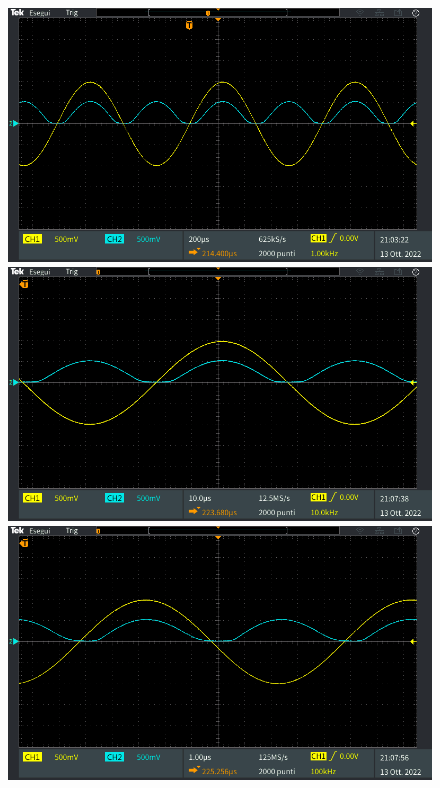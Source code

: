 \begin{figure}[tbh]
	\centering
	\begin{minipage}{.496\textwidth}
		\includegraphics[width=\linewidth]{./ImageFiles/Laboratorio 2/TEK00041.PNG}
	\end{minipage}
	\begin{minipage}{.496\textwidth}
		\includegraphics[width=\linewidth]{./ImageFiles/Laboratorio 2/TEK00046.PNG}
	\end{minipage}
	\begin{minipage}{.496\textwidth}
		\includegraphics[width=\linewidth]{./ImageFiles/Laboratorio 2/TEK00047.PNG}

\end{minipage}
\end{figure}
